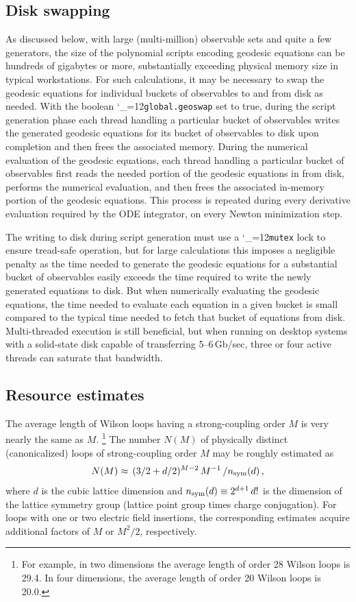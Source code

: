\documentclass [12pt]{article}
\makeatletter
\renewcommand{\tt}{\begingroup\catcode`_=12\def\_{\string_}\tt@}
\newcommand{\tt@}[1]{\texttt{#1}\endgroup}
\makeatother
\begin{document}
\subsection {Disk swapping}

As discussed below,
with large (multi-million) observable sets and quite a few
generators, the size of the polynomial scripts encoding
geodesic equations 
can be hundreds of gigabytes or more, substantially
exceeding physical memory size in typical workstations.
For such calculations, it may be necessary to swap
the geodesic equations for individual
buckets of observables to and from disk as needed.
With the boolean \tt{global.geoswap} set to true, 
during the script generation phase
each thread handling a particular bucket
of observables writes the generated geodesic equations
for its bucket of observables to disk upon completion
and then frees the associated memory.
During the numerical evaluation of the geodesic equations,
each thread handling a particular bucket of observables
first reads the needed portion of the geodesic equations
in from disk, performs the numerical evaluation,
and then frees the associated in-memory portion of the 
geodesic equations.
This process is repeated during every derivative
evaluation required by the ODE integrator, on every
Newton minimization step.

The writing to disk during script generation must use
a \tt{mutex} lock to ensure tread-safe operation, but
for large calculations
this imposes a negligible penalty as the time needed to
generate the geodesic equations for a substantial bucket of
observables easily exceeds the time required to write the newly 
generated equations to disk.
But when numerically evaluating the geodesic equations,
the time needed to evaluate each equation in a given
bucket is small compared to the typical time needed to
fetch that bucket of equations from disk.
Multi-threaded execution is still beneficial, but when
running on desktop systems with a solid-state disk capable of
transferring 5--6\,Gb/sec, three or four active threads can
saturate that bandwidth.

\subsection{Resource estimates}

The average length of Wilson loops having
a strong-coupling order $M$ is very nearly the same as $M$.%
\footnote
    {%
    For example, in two dimensions the average length of
    order 28 Wilson loops is 29.4.
    In four dimensions, the average length of order 20
    Wilson loops is 20.0.
    }
The number $N(M)$ of physically distinct (canonicalized) loops
of strong-coupling order $M$ may be roughly estimated
as
\begin{equation}
    N(M) \approx \, (3/2 + d/2)^{M-2} \, M^{-1} \, / n_{\rm sym}(d) \,,
\end{equation}
where $d$ is the cubic lattice dimension and
$
    n_{\rm sym}(d) \equiv 2^{d+1} \, d!
$
is the dimension of the lattice symmetry group
(lattice point group times charge conjugation).
For loops with one or two electric field insertions, the corresponding
estimates acquire additional factors of $M$ or $M^2/2$, respectively.
\end{document}
